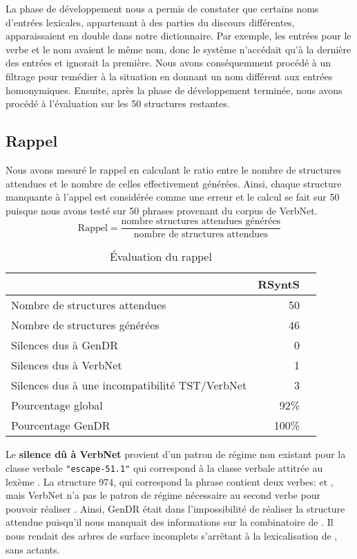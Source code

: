 La phase de développement nous a permis de constater que certains noms d'entrées lexicales, appartenant à des parties du discours différentes, apparaissaient en double dans notre dictionnaire. Par exemple, les entrées pour le verbe  et le nom  avaient le même nom, donc le système n'accédait qu'à la dernière des entrées et ignorait la première. Nous avons conséquemment procédé à un filtrage pour remédier à la situation en donnant un nom différent aux entrées homonymiques. Ensuite, après la phase de développement terminée, nous avons procédé à l'évaluation sur les 50 structures restantes.
                              
\subsection{Rappel}
Nous avons mesuré le rappel en calculant le ratio entre le nombre de structures attendues et le nombre de celles effectivement générées. Ainsi, chaque structure manquante à l'appel est considérée comme une erreur et le calcul se fait sur 50 puisque nous avons testé sur 50 phrases provenant du corpus de VerbNet.
\[\text{Rappel} = \frac{\text{nombre structures attendues générées}}{\text{nombre de structures attendues}}\]

\begin{table}
\caption{Évaluation du rappel}
\begin{tabular}{lrr}
 \toprule
   & RSyntS\\
 \midrule
 Nombre de structures attendues   & 50\\
 Nombre de structures générées &  46\\
 Silences dus à GenDR & 0\\
 Silences dus à VerbNet    & 1\\
 Silences dus à une incompatibilité TST/VerbNet & 3\\
 \midrule
Pourcentage global & 92\% \\
Pourcentage GenDR & 100\% \\
\bottomrule
\end{tabular}
\end{table}

Le \textbf{silence dû à VerbNet} provient d'un patron de régime non existant pour la classe verbale \texttt{"escape-51.1"} qui correspond à la classe verbale attitrée au lexème . La structure 974, qui correspond la phrase  contient deux verbes:  et , mais VerbNet n'a pas le patron de régime nécessaire au second verbe pour pouvoir réaliser . Ainsi, GenDR était dans l'impossibilité de réaliser la structure attendue puisqu'il nous manquait des informations sur la combinatoire de . Il nous rendait des arbres de surface incomplets s'arrêtant à la lexicalisation de , sans actants.

